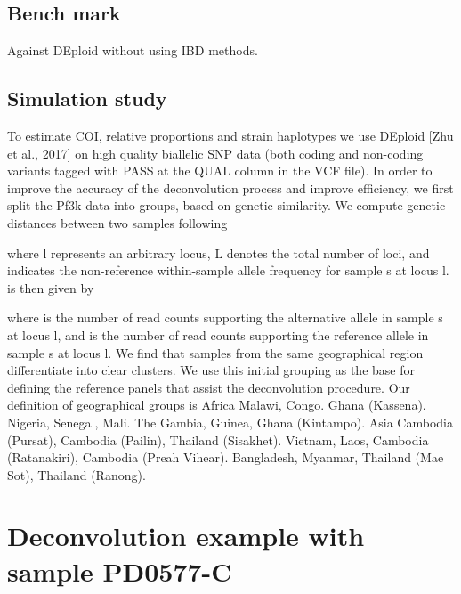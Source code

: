 \documentclass{article}
\begin{document}
\subsection{Bench mark}
Against DEploid without using IBD methods.

\subsection{Simulation study}


To estimate COI, relative proportions and strain haplotypes we use DEploid [Zhu et al., 2017] on high quality biallelic SNP data (both coding and non-coding variants tagged with PASS at the QUAL column in the VCF file). In order to improve the accuracy of the deconvolution process and improve efficiency, we first split the Pf3k data into groups, based on genetic similarity. We compute genetic distances between two samples following

where l represents an arbitrary locus, L denotes the total number of loci, and  indicates the non-reference within-sample allele frequency for sample s at locus l.  is then given by

where  is the number of read counts supporting the alternative allele in sample s at locus l, and  is the number of read counts supporting the reference allele in sample s at locus l.
We find that samples from the same geographical region differentiate into clear clusters. We use this initial grouping as the base for defining the reference panels that assist the deconvolution procedure. Our definition of geographical groups is
Africa
Malawi, Congo.
Ghana (Kassena).
Nigeria, Senegal, Mali.
The Gambia, Guinea, Ghana (Kintampo).
Asia
Cambodia (Pursat), Cambodia (Pailin), Thailand (Sisakhet).
Vietnam, Laos, Cambodia (Ratanakiri), Cambodia (Preah Vihear).
Bangladesh, Myanmar, Thailand (Mae Sot), Thailand (Ranong).


\section{Deconvolution example with sample PD0577-C}
\end{document}
